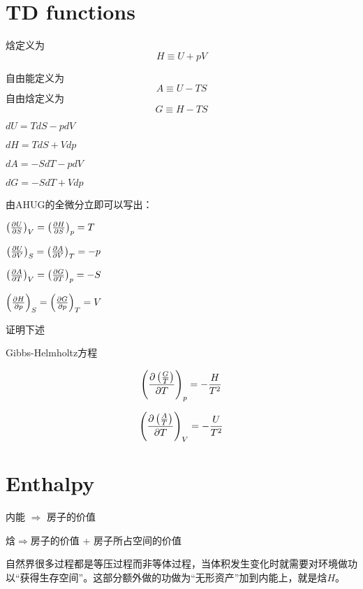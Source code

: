 \documentclass[CJK]{beamer}
\begin{document}
\section{TD functions}
\begin{frame}
\bch
{\blue 焓}定义为
{\blue
$$H \equiv U + pV$$}
\ech
\end{frame}

\begin{frame}
\bch
{\blue 自由能}定义为
{\blue 
$$ A \equiv U - TS $$}
{\blue 自由焓}定义为
{\blue 
$$ G \equiv H - TS $$}
\ech
\end{frame}

\begin{frame}
\bch
\bitem
\item{\blue $dU = TdS - pdV$}
\item{\blue $dH = TdS + Vdp$}
\item{\blue $dA = -SdT - pdV$}
\item{\blue $dG = -SdT + Vdp$}
\eitem
\ech
\end{frame}

\begin{frame}
\bch
由AHUG的全微分立即可以写出：
\bitem
\item{\blue $\left(\frac{\partial U}{\partial S}\right)_{V} = \left(\frac{\partial H}{\partial S}\right)_{p} = T$}
\item{\blue $\left(\frac{\partial U}{\partial V}\right)_{S} = \left(\frac{\partial A}{\partial V}\right)_{T} = -p$}
\item{\blue $\left(\frac{\partial A}{\partial T}\right)_{V} = \left(\frac{\partial G}{\partial T}\right)_{p} = -S$}
\item{\blue $\left(\frac{\partial H}{\partial p}\right)_{S} = \left(\frac{\partial G}{\partial p}\right)_{T} = V$}
\eitem
\ech
\end{frame}

\begin{frame}
\bch
{}

证明下述{\blue Gibbs-Helmholtz方程
\bitem
\item{\blue $$\left(\frac{\partial \left(\frac{G}{T}\right)}{\partial T}\right)_{p} = -\frac{H}{T^2}$$}
\item{\blue $$\left(\frac{\partial \left(\frac{A}{T}\right)}{\partial T}\right)_{V} = -\frac{U}{T^2}$$}
\eitem
}
\ech
\end{frame}

\section{Enthalpy}

\begin{frame}
\bch

内能 $\Rightarrow$ 房子的价值

\skipline

焓$\Rightarrow$房子的价值 + 房子所占空间的价值

\skiplines

自然界很多过程都是等压过程而非等体过程，当体积发生变化时就需要对环境做功以“获得生存空间”。这部分额外做的功做为“无形资产”加到内能上，就是焓$H$。


\ech
\end{frame}
\end{document}
